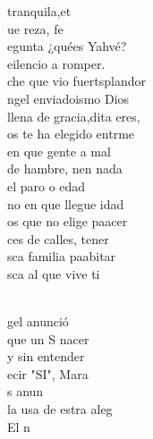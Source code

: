 \documentclass[12pt]{article}
\begin{document}
\begin{multicols*}{2}
\begin{cancion}%
	tranquila,et\\
	ue  reza, fe\\
	egunta ¿quées Yahvé? \\
	eilencio a romper.\\
	che que vio fuertsplandor\\
	ngel enviadoismo Dios\\
	llena de gracia,dita eres,\\
	os te ha elegido entrme\\
	en que gente a mal\\
	de hambre, nen nada\\
	 el paro o edad\\
	no en que llegue idad\\
	os que  no elige paacer\\
	ces de calles, tener\\
	sca familia paabitar\\
	sca al que vive ti\\\jump\\
	\begin{chorus}%
	gel anunció \\
	que un S nacer\\
	y sin entender \\
	ecir "SI", Mara\\
	s  anun \\
	la usa de estra aleg\\
	El n\\

\end{chorus}
\end{cancion}
\end{multicols*}
\end{document}
